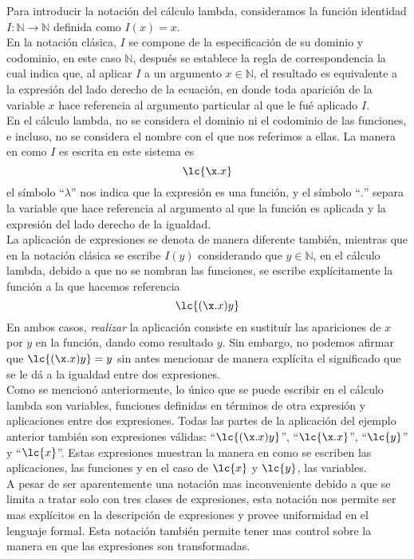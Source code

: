 Para introducir la notación del cálculo lambda, consideramos la función
identidad \(I : \mathbb{N} \to \mathbb{N}\) definida como \(I(x)=x\).\\

En la notación clásica, \(I\) se compone de la especificación de su dominio y
codominio, en este caso \(\mathbb{N}\), después se establece la regla de
correspondencia la cual indica que, al aplicar \(I\) a un argumento \(x\in
\mathbb{N}\), el resultado es equivalente a la expresión del lado derecho de la
ecuación, en donde toda aparición de la variable \(x\) hace referencia al
argumento particular al que le fué aplicado \(I\).\\

En el cálculo lambda, no se considera el dominio ni el codominio de las
funciones, e incluso, no se considera el nombre con el que nos referimos a
ellas. La manera en como \(I\) es escrita en este sistema es \[\lc{\x.x}\] el
símbolo ``\(\lambda\)'' nos indica que la expresión es una función, y el símbolo
``\(.\)'' separa la variable que hace referencia al argumento al que la función
es aplicada y la expresión del lado derecho de la igualdad.\\

La aplicación de expresiones se denota de manera diferente también, mientras que
en la notación clásica se escribe \(I(y)\) considerando que \(y\in \mathbb{N}\),
en el cálculo lambda, debido a que no se nombran las funciones, se escribe
explícitamente la función a la que hacemos referencia \[\lc{(\x.x)y}\] En ambos
casos, \emph{realizar} la aplicación consiste en sustituír las apariciones de
\(x\) por \(y\) en la función, dando como resultado \(y\). Sin embargo, no
podemos afirmar que \(\lc{(\x.x)y}=y\) sin antes mencionar de manera explícita
el significado que se le dá a la igualdad entre dos expresiones.\\

Como se mencionó anteriormente, lo único que se puede escribir en el cálculo
lambda son variables, funciones definidas en términos de otra expresión y
aplicaciones entre dos expresiones. Todas las partes de la aplicación del
ejemplo anterior también son expresiones válidas: ``\(\lc{(\x.x)y}\)'',
``\(\lc{\x.x}\)'', ``\(\lc{y}\)'' y ``\(\lc{x}\)''. Estas expresiones muestran
la manera en como se escriben las aplicaciones, las funciones y en el caso de
\(\lc{x}\) y \(\lc{y}\), las variables.\\

A pesar de ser aparentemente una notación mas inconveniente debido a que se
limita a tratar solo con tres clases de expresiones, esta notación nos permite
ser mas explícitos en la descripción de expresiones y provee uniformidad en el
lenguaje formal. Esta notación también permite tener mas control sobre la manera
en que las expresiones son transformadas.\\

